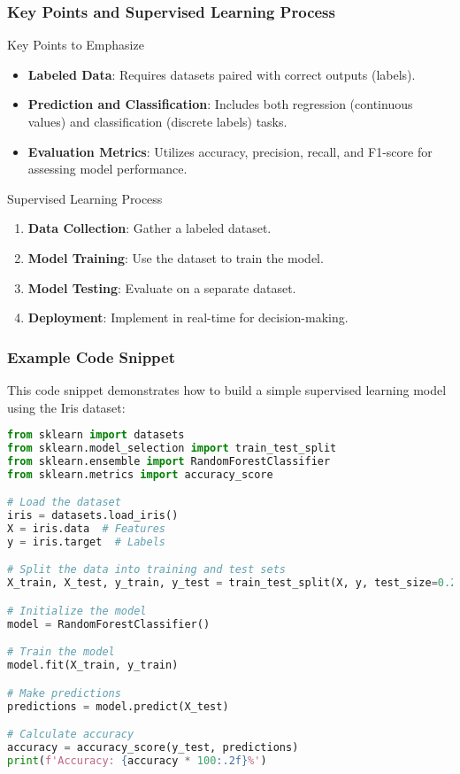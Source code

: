 \documentclass[aspectratio=169]{beamer}
\begin{document}
\begin{frame}[fragile]
    \frametitle{Key Points and Supervised Learning Process}
    \begin{block}{Key Points to Emphasize}
        \begin{itemize}
            \item \textbf{Labeled Data}: Requires datasets paired with correct outputs (labels).
            \item \textbf{Prediction and Classification}: Includes both regression (continuous values) and classification (discrete labels) tasks.
            \item \textbf{Evaluation Metrics}: Utilizes accuracy, precision, recall, and F1-score for assessing model performance.
        \end{itemize}
    \end{block}

    \begin{block}{Supervised Learning Process}
        \begin{enumerate}
            \item \textbf{Data Collection}: Gather a labeled dataset.
            \item \textbf{Model Training}: Use the dataset to train the model.
            \item \textbf{Model Testing}: Evaluate on a separate dataset.
            \item \textbf{Deployment}: Implement in real-time for decision-making.
        \end{enumerate}
    \end{block}
\end{frame}

\begin{frame}[fragile]
    \frametitle{Example Code Snippet}
    This code snippet demonstrates how to build a simple supervised learning model using the Iris dataset:

    \begin{lstlisting}[language=Python]
from sklearn import datasets
from sklearn.model_selection import train_test_split
from sklearn.ensemble import RandomForestClassifier
from sklearn.metrics import accuracy_score

# Load the dataset
iris = datasets.load_iris()
X = iris.data  # Features
y = iris.target  # Labels

# Split the data into training and test sets
X_train, X_test, y_train, y_test = train_test_split(X, y, test_size=0.2, random_state=42)

# Initialize the model
model = RandomForestClassifier()

# Train the model
model.fit(X_train, y_train)

# Make predictions
predictions = model.predict(X_test)

# Calculate accuracy
accuracy = accuracy_score(y_test, predictions)
print(f'Accuracy: {accuracy * 100:.2f}%')
    \end{lstlisting}

\end{frame}
\end{document}
